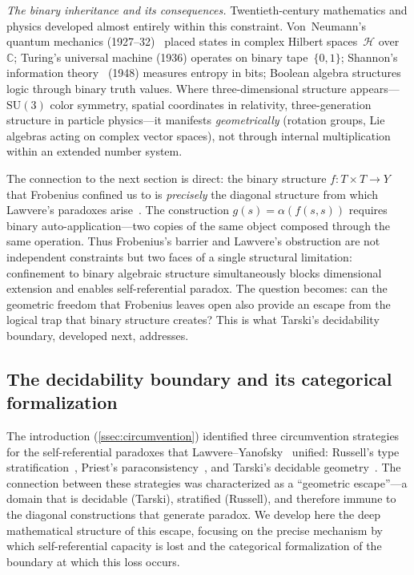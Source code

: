 \medskip
\noindent\textit{The binary inheritance and its consequences.}\quad
Twentieth-century mathematics and physics developed almost entirely
within this constraint.  Von~Neumann's quantum mechanics (1927--32)~\cite{vonneumann32}
placed states in complex Hilbert spaces~$\mathcal{H}$ over~$\mathbb{C}$;
Turing's universal machine (1936) operates on binary tape~$\{0,1\}$;
Shannon's information theory~\cite{shannon48} (1948) measures entropy in bits;
Boolean algebra structures logic through binary truth values.
Where three-dimensional structure appears---$\mathrm{SU}(3)$ color
symmetry, spatial coordinates in relativity, three-generation
structure in particle physics---it manifests \emph{geometrically}
(rotation groups, Lie algebras acting on complex vector spaces), not
through internal multiplication within an extended number system.

The connection to the next section is direct: the binary structure
$f\colon T \times T \to Y$ that Frobenius confined us to is
\emph{precisely} the diagonal structure from which Lawvere's
paradoxes arise~\cite{lawvere69,yanofsky03}.  The construction $g(s) = \alpha(f(s,s))$ requires
binary auto-application---two copies of the same object composed
through the same operation.  Thus Frobenius's barrier and Lawvere's
obstruction are not independent constraints but two faces of a single
structural limitation: confinement to binary algebraic structure
simultaneously blocks dimensional extension and enables
self-referential paradox.  The question becomes: can the geometric
freedom that Frobenius leaves open also provide an escape from the
logical trap that binary structure creates?  This is what
Tarski's decidability boundary, developed next, addresses.



\subsection{The decidability boundary and its categorical
formalization}\label{ssec:decidability}

The introduction (\cref{ssec:circumvention}) identified three circumvention strategies
for the self-referential paradoxes that Lawvere--Yanofsky~\cite{lawvere69,yanofsky03} unified:
Russell's type stratification~\cite{russell08}, Priest's paraconsistency~\cite{priest79}, and Tarski's
decidable geometry~\cite{tarski52}.  The connection between these strategies was
characterized as a ``geometric escape''---a domain that is decidable
(Tarski), stratified (Russell), and therefore immune to the diagonal
constructions that generate paradox.  We develop here the deep
mathematical structure of this escape, focusing on the precise
mechanism by which self-referential capacity is lost and the
categorical formalization of the boundary at which this loss occurs.


